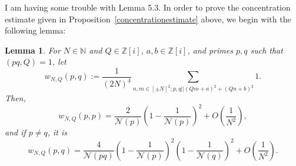 \documentclass[11pt]{amsart}
\newtheorem{lemma}{Lemma}[section]
\theoremstyle{definition}
\newcommand{\N}{{\mathbb N}}
\newcommand{\NN}{{\mathcal N}}
\newcommand{\Z}{{\mathbb Z}}
\begin{document}
{\color{red} I am having some trouble with Lemma 5.3.}
In order to prove the concentration estimate given in Proposition~\ref{concentrationestimate} above, we begin with the following lemma:
\begin{lemma}
For $N\in \N$ and $Q \in \Z[i]$, $a, b \in \Z[i]$, and primes $p,q$ such that $(pq, Q)=1$, let
\[
w_{N,Q}(p,q):=\frac{1}{(2N)^4} \sum_{n, m \in [\pm N]^2; p, q|| (Qm+a)^2+(Qn+b)^2} 1.
\]
Then,
\begin{equation}\label{asymptoticpqequal}
w_{N, Q}(p,p) = \frac{2}{\NN(p)}\left(1-\frac{1}{\NN(p)} \right)^2+O\left(\frac{1}{N^2}\right),
\end{equation}
and if $p \neq q$, it is
\begin{equation}\label{asymptoticpqunequal}
w_{N,Q}(p,q) = \frac{4}{\NN(pq)}\left(1-\frac{1}{\NN(p)}\right)^2\left(1-\frac{1}{\NN(q)}\right)^2+O\left(\frac{1}{N^2}\right).
\end{equation}
\end{lemma}
\end{document}
